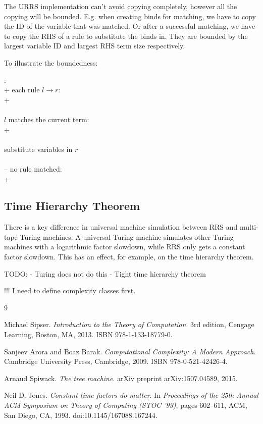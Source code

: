 \documentclass[11pt]{article}
\begin{document}
The URRS implementation can't avoid copying completely, however all the copying
will be bounded. E.g. when creating binds for matching, we have to copy the
ID of the variable that was matched. Or after a successful matching, we have to
copy the RHS of a rule to substitute the binds in. They are bounded by the
largest variable ID and largest RHS term size respectively.

To illustrate the boundedness:

\begin{pseudo}
  : \\+
     each rule $l \to r$:  \\+
       \\
       \\
       $l$ matches the current term: \\+
         \\
         \\
        substitute variables in $r$ \\
         \\--
     no rule matched: \\+
\end{pseudo}

\subsection{Time Hierarchy Theorem}

There is a key difference in universal machine simulation
between RRS and multi-tape Turing machines. A universal Turing machine
simulates other Turing machines with a logarithmic factor slowdown, while
RRS only gets a constant factor slowdown. This has an effect,
for example, on the time hierarchy theorem.


TODO:
- Turing does not do this
- Tight time hierarchy theorem

!!! I need to define complexity classes first.

\begin{thebibliography}{9}

Michael Sipser.
\emph{Introduction to the Theory of Computation}.
3rd edition, Cengage Learning, Boston, MA, 2013.
ISBN 978-1-133-18779-0.

Sanjeev Arora and Boaz Barak.
\emph{Computational Complexity: A Modern Approach}.
Cambridge University Press, Cambridge, 2009.
ISBN 978-0-521-42426-4.

Arnaud Spiwack.
\emph{The tree machine}.
arXiv preprint arXiv:1507.04589, 2015.

Neil D. Jones.
\emph{Constant time factors do matter}.
In \emph{Proceedings of the 25th Annual ACM Symposium on Theory of Computing (STOC '93)},
pages 602--611, ACM, San Diego, CA, 1993.
doi:10.1145/167088.167244.

\end{thebibliography}
\end{document}

